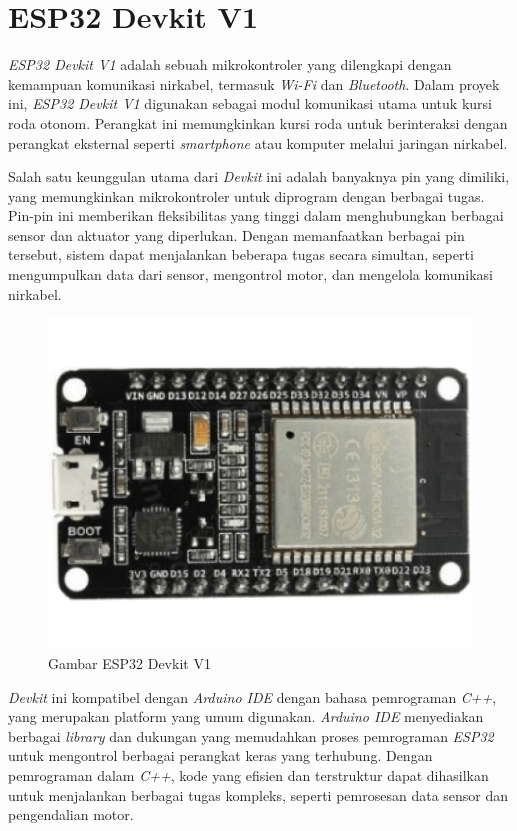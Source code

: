 \section{ESP32 Devkit V1}
\label{sec:ESP32 Devkit V1}

\emph{ESP32 Devkit V1} adalah sebuah mikrokontroler yang dilengkapi dengan kemampuan komunikasi nirkabel, termasuk \emph{Wi-Fi} dan \emph{Bluetooth}. Dalam proyek ini, \emph{ESP32 Devkit V1} digunakan sebagai modul komunikasi utama untuk kursi roda otonom. Perangkat ini memungkinkan kursi roda untuk berinteraksi dengan perangkat eksternal seperti \emph{smartphone} atau komputer melalui jaringan nirkabel.

Salah satu keunggulan utama dari \emph{Devkit} ini adalah banyaknya pin yang dimiliki, yang memungkinkan mikrokontroler untuk diprogram dengan berbagai tugas. Pin-pin ini memberikan fleksibilitas yang tinggi dalam menghubungkan berbagai sensor dan aktuator yang diperlukan. Dengan memanfaatkan berbagai pin tersebut, sistem dapat menjalankan beberapa tugas secara simultan, seperti mengumpulkan data dari sensor, mengontrol motor, dan mengelola komunikasi nirkabel.

\begin{figure}[H]
  \centering
  \includegraphics[scale=0.2]{gambar/ESP32-DEVKIT-V1-board.png}
  \caption{Gambar ESP32 Devkit V1}
  \label{fig:Gambar ESP32Devkit V1}
\end{figure}

\emph{Devkit} ini kompatibel dengan \emph{Arduino IDE} dengan bahasa pemrograman \emph{C++}, yang merupakan platform yang umum digunakan. \emph{Arduino IDE} menyediakan berbagai \emph{library} dan dukungan yang memudahkan proses pemrograman \emph{ESP32} untuk mengontrol berbagai perangkat keras yang terhubung. Dengan pemrograman dalam \emph{C++}, kode yang efisien dan terstruktur dapat dihasilkan untuk menjalankan berbagai tugas kompleks, seperti pemrosesan data sensor dan pengendalian motor.

